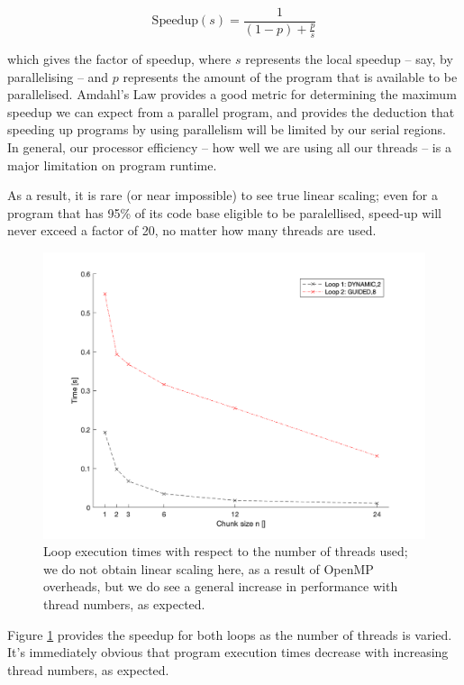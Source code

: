 \documentclass{article} %
\begin{document}
$$
\text{Speedup}(s) = \frac{1}{\left( 1 - p\right) + \frac{p}{s}}
$$

which gives the factor of speedup, where $s$ represents the local speedup -- say, by parallelising -- and $p$ represents the amount of the program that is available to be parallelised.
Amdahl's Law provides a good metric for determining the maximum speedup we can expect from a parallel program, and provides the deduction that speeding up programs by using parallelism will be limited by our serial regions. 
In general, our processor efficiency -- how well we are using all our threads -- is a major limitation on program runtime.

As a result, it is rare (or near impossible) to see true linear scaling; even for a program that has 95\% of its code base eligible to be paralellised, speed-up will never exceed a factor of 20, no matter how many threads are used.

\begin{figure}
    \centering
    \includegraphics[height=.35\textheight]{part1_plots/bestruns_all}
    \caption{Loop execution times with respect to the number of threads used; we do not obtain linear scaling here, as a result of OpenMP overheads, but we do see a general increase in performance with thread numbers, as expected.}
    \label{fig:threadall}
\end{figure}

Figure \ref{fig:threadall} provides the speedup for both loops as the number of threads is varied.
It's immediately obvious that program execution times decrease with increasing thread numbers, as expected.
\end{document}
